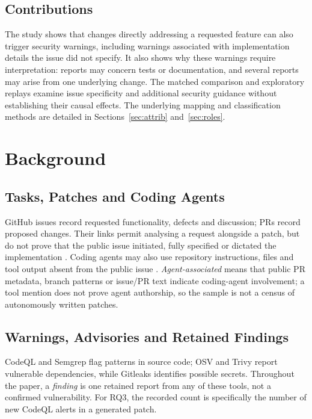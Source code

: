 \documentclass[acmsmall,screen,nonacm]{acmart}
\begin{document}
\subsection{Contributions}

The study shows that changes directly addressing a requested feature can also trigger security warnings, including warnings associated with implementation details the issue did not specify. It also shows why these warnings require interpretation: reports may concern tests or documentation, and several reports may arise from one underlying change. The matched comparison and exploratory replays examine issue specificity and additional security guidance without establishing their causal effects. The underlying mapping and classification methods are detailed in Sections~\ref{sec:attrib} and~\ref{sec:roles}.

\section{Background}

\subsection{Tasks, Patches and Coding Agents}

GitHub issues record requested functionality, defects and discussion; PRs record proposed changes. Their links permit analysing a request alongside a patch, but do not prove that the public issue initiated, fully specified or dictated the implementation \cite{b5}. Coding agents may also use repository instructions, files and tool output absent from the public issue \cite{b20,b22}. \emph{Agent-associated} means that public PR metadata, branch patterns or issue/PR text indicate coding-agent involvement; a tool mention does not prove agent authorship, so the sample is not a census of autonomously written patches.

\subsection{Warnings, Advisories and Retained Findings}

CodeQL and Semgrep flag patterns in source code; OSV and Trivy report vulnerable dependencies, while Gitleaks identifies possible secrets. Throughout the paper, a \emph{finding} is one retained report from any of these tools, not a confirmed vulnerability. For RQ3, the recorded count is specifically the number of new CodeQL alerts in a generated patch.
\end{document}
